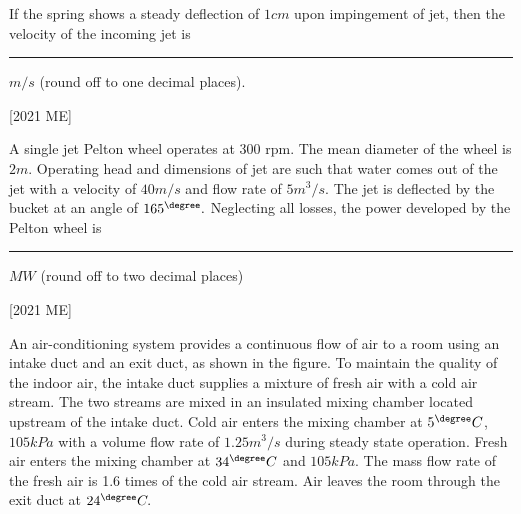 If the spring shows a steady deflection of $1 cm$ upon impingement of jet,
then the velocity of the incoming jet is \rule{2cm}{0.4pt}$m/s$ (round off to one decimal places).

\hfill [2021 ME]
\item A single jet Pelton wheel operates at 300 rpm. The mean diameter of the
wheel is $2 m$. Operating head and dimensions of jet are such that water
comes out of the jet with a velocity of $40 m/s$ and flow rate of $5 m^3
/s$. The jet
is deflected by the bucket at an angle of $165^{\degree}.$ Neglecting all losses, the
power developed by the Pelton wheel is \rule{2cm}{0.4pt} $MW$ (round off to two decimal places)

\hfill [2021 ME]
\item An air-conditioning system provides a continuous flow of air to a room using
an intake duct and an exit duct, as shown in the figure. To maintain the
quality of the indoor air, the intake duct supplies a mixture of fresh air with
a cold air stream. The two streams are mixed in an insulated mixing chamber
located upstream of the intake duct. Cold air enters the mixing chamber at
$5 ^{\degree} C$, $105 kPa$ with a volume flow rate of $1.25 m^3/s$ during steady state
operation. Fresh air enters the mixing chamber at $34 ^{\degree} C$ and $105 kPa$. The
mass flow rate of the fresh air is 1.6 times of the cold air stream. Air leaves
the room through the exit duct at $24 ^{\degree} C.$
\begin{figure}[H]
\centering
{}%

\label{fig:my_label}
\end{figure}
